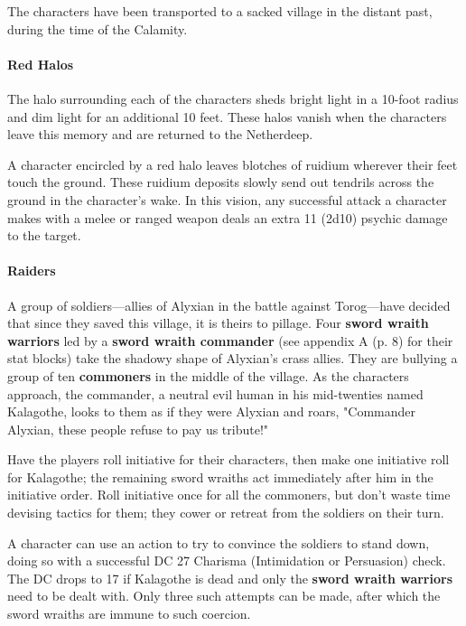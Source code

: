 \documentclass[a4paper, 11pt, bg=full, twocolumn, nooutline]{dndbook}
\begin{document}
The characters have been transported to a sacked village in the distant past, during the time of the Calamity.

\paragraph{Red Halos}

The halo surrounding each of the characters sheds bright light in a 10-foot radius and dim light for an additional 10 feet. These halos vanish when the characters leave this memory and are returned to the Netherdeep.

A character encircled by a red halo leaves blotches of ruidium wherever their feet touch the ground. These ruidium deposits slowly send out tendrils across the ground in the character's wake. In this vision, any successful attack a character makes with a melee or ranged weapon deals an extra 11 (2d10) psychic damage to the target.

\paragraph{Raiders}

A group of soldiers---allies of Alyxian in the battle against Torog---have decided that since they saved this village, it is theirs to pillage. Four \textbf{sword wraith warriors} led by a \textbf{sword wraith commander} (see appendix A (p. 8) for their stat blocks) take the shadowy shape of Alyxian's crass allies. They are bullying a group of ten \textbf{commoners} in the middle of the village. As the characters approach, the commander, a neutral evil human in his mid-twenties named Kalagothe, looks to them as if they were Alyxian and roars, "Commander Alyxian, these people refuse to pay us tribute!"

Have the players roll initiative for their characters, then make one initiative roll for Kalagothe; the remaining sword wraiths act immediately after him in the initiative order. Roll initiative once for all the commoners, but don't waste time devising tactics for them; they cower or retreat from the soldiers on their turn.

A character can use an action to try to convince the soldiers to stand down, doing so with a successful DC 27 Charisma (Intimidation or Persuasion) check. The DC drops to 17 if Kalagothe is dead and only the \textbf{sword wraith warriors} need to be dealt with. Only three such attempts can be made, after which the sword wraiths are immune to such coercion.
\end{document}
